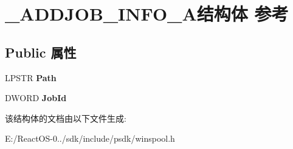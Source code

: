 \hypertarget{struct___a_d_d_j_o_b___i_n_f_o__1_a}{}\section{\+\_\+\+A\+D\+D\+J\+O\+B\+\_\+\+I\+N\+F\+O\+\_\+A结构体 参考}
\label{struct___a_d_d_j_o_b___i_n_f_o__1_a}
\subsection*{Public 属性}
\begin{DoxyCompactItemize}
\item 
\mbox{\label{struct___a_d_d_j_o_b___i_n_f_o__1_a_ad70ffa816b388b50338fa800472fd21b}} 
L\+P\+S\+TR {\bfseries Path}
\item 
\mbox{\label{struct___a_d_d_j_o_b___i_n_f_o__1_a_a7f2a18c0837df98f34634d8c581a99b2}} 
D\+W\+O\+RD {\bfseries Job\+Id}
\end{DoxyCompactItemize}


该结构体的文档由以下文件生成\+:\begin{DoxyCompactItemize}
\item 
E\+:/\+React\+O\+S-\/0../sdk/include/psdk/winspool.\+h\end{DoxyCompactItemize}

